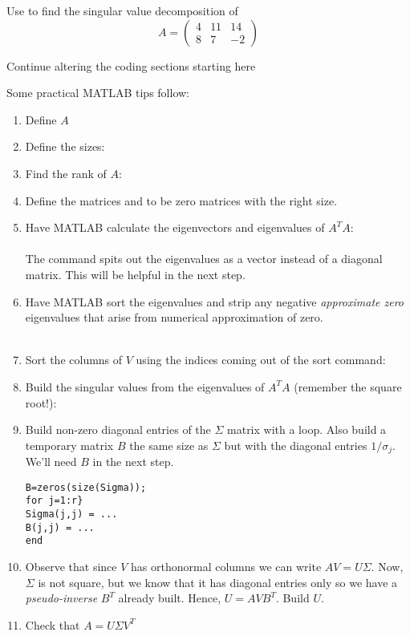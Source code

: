 \begin{problem}
    Use \ProgLang to find the singular value decomposition of 
    \[ A = \begin{pmatrix} 4 & 11 & 14 \\ 8 & 7 & -2 \end{pmatrix} \]


\ifnum{} {\color{red} Continue altering the coding sections starting here}\fi

    Some practical MATLAB tips follow:
    \begin{enumerate}
        \item Define $A$
        \item Define the sizes: 
        \item Find the rank of $A$: 
        \item Define the matrices  and  to be zero matrices with
            the right size.
        \item Have MATLAB calculate the eigenvectors and eigenvalues of $A^T A$:\\
            \\
            The  command spits out the eigenvalues as a vector instead of
            a diagonal matrix.  This will be helpful in the next step.
        \item Have MATLAB sort the eigenvalues and strip any negative {\it approximate
            zero} eigenvalues that arise from numerical approximation of zero. \\
            \\
        \item Sort the columns of $V$ using the indices coming out of the sort command: \\
        \item Build the singular values from the eigenvalues of $A^TA$ (remember the
            square root!):\\ 
        \item Build non-zero diagonal entries of the $\Sigma$ matrix with a loop.  Also build a
            temporary matrix $B$ the same size as $\Sigma$ but with the diagonal entries
            $1/\sigma_j$.  We'll need $B$ in the next step. 
\begin{lstlisting}
B=zeros(size(Sigma));
for j=1:r}
Sigma(j,j) = ...
B(j,j) = ...
end
\end{lstlisting}
        \item Observe that since $V$ has orthonormal columns we can write $AV = U \Sigma$.
            Now, $\Sigma$ is not square, but we know that it has diagonal entries only so
            we have a {\it pseudo-inverse} $B^T$ already built.  Hence, $U = A V B^T$.
            Build $U$.
        \item Check that $A = U \Sigma V^T$
    \end{enumerate}
\end{problem}

